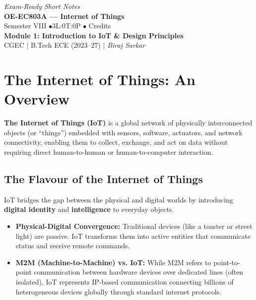 \documentclass[12pt,a4paper]{article}
\begin{document}
\begin{center}
  \hfill \textit{Exam-Ready Short Notes} \\
  \vspace{6pt}
  {\LARGE\bfseries\color{myred} OE-EC803A --- Internet of Things}\\[5pt]
  {\normalsize\color{mydark} Semester VIII \quad$\bullet$\quad 3L:0T:0P \quad$\bullet$ Credits}\\[3pt]
  {\normalsize\color{myteal}\textbf{Module 1: Introduction to IoT \& Design Principles}}\\[3pt]
  {\small\color{mydark} CGEC \;$|$\; B.Tech ECE (2023--27) \;$|$\; \textit{Biraj Sarkar}}
\end{center}
\vspace{2pt}
\noindent{\color{myred}\rule{\linewidth}{1.5pt}}
\vspace{2pt}

\hypersetup{linkcolor=mydark}
\tableofcontents
\hypersetup{linkcolor=myteal}
\newpage

\section{The Internet of Things: An Overview}

\begin{tcolorbox}[defbox, title={Internet of Things (IoT)}]
  \textbf{The Internet of Things (IoT)} is a global network of physically interconnected objects (or ``things'') embedded with sensors, software, actuators, and network connectivity, enabling them to collect, exchange, and act on data without requiring direct human-to-human or human-to-computer interaction.
\end{tcolorbox}

\subsection{The Flavour of the Internet of Things}
IoT bridges the gap between the physical and digital worlds by introducing \textbf{digital identity} and \textbf{intelligence} to everyday objects.
\begin{itemize}[leftmargin=*, itemsep=3pt]
  \item \textbf{Physical-Digital Convergence:} Traditional devices (like a toaster or street light) are passive. IoT transforms them into active entities that communicate status and receive remote commands.
  \item \textbf{M2M (Machine-to-Machine) vs. IoT:} While M2M refers to point-to-point communication between hardware devices over dedicated lines (often isolated), IoT represents IP-based communication connecting billions of heterogeneous devices globally through standard internet protocols.
\end{itemize}
\end{document}
